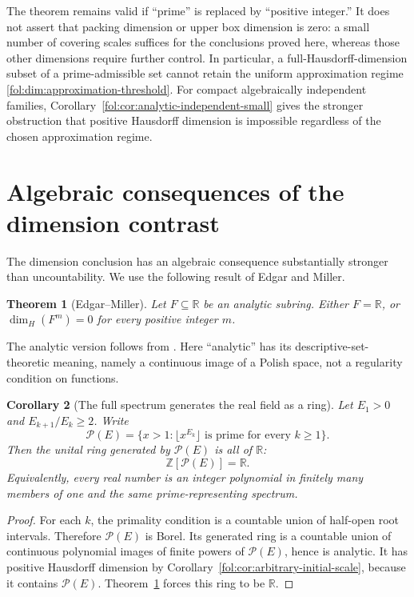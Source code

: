 \documentclass[11pt,a4paper]{article}
\newtheorem{theorem}{Theorem}[section]
\newtheorem{corollary}[theorem]{Corollary}
\theoremstyle{definition}
\theoremstyle{remark}
\numberwithin{equation}{section}
\begin{document}
The theorem remains valid if ``prime'' is replaced by ``positive
integer.''  It does not assert that packing dimension or upper box
dimension is zero: a small number of covering scales suffices for the
conclusions proved here, whereas those other dimensions require further
control.  In particular, a full-Hausdorff-dimension subset of a prime-admissible
set cannot retain the uniform approximation regime
\eqref{fol:dim:approximation-threshold}. For compact algebraically independent
families, Corollary~\ref{fol:cor:analytic-independent-small} gives the stronger
obstruction that positive Hausdorff dimension is impossible regardless
of the chosen approximation regime.


\section{Algebraic consequences of the dimension contrast}
\label{fol:sec:dimension-algebra}

The dimension conclusion has an algebraic consequence substantially stronger
than uncountability. We use the following result of Edgar and Miller.

\begin{theorem}[Edgar--Miller]\label{fol:thm:edgar-miller}
Let $F\subseteq\mathbb R$ be an analytic subring. Either $F=\mathbb R$, or
$\dim_H(F^m)=0$ for every positive integer $m$.
\end{theorem}

The analytic version follows from \cite[Theorem~1 and the subsequent
remarks]{EdgarMiller2003}. Here ``analytic'' has its descriptive-set-theoretic
meaning, namely a continuous image of a Polish space, not a regularity
condition on functions.

\begin{corollary}[The full spectrum generates the real field as a ring]
\label{fol:cor:prime-ring}
Let $E_1>0$ and $E_{k+1}/E_k\ge2$. Write
\[
 \mathcal P(E)=\{x>1:\lfloor x^{E_k}\rfloor
                 \text{ is prime for every }k\ge1\}.
\]
Then the unital ring generated by $\mathcal P(E)$ is all of $\mathbb R$:
\[
 \boxed{\mathbb Z[\mathcal P(E)]=\mathbb R.}
\]
Equivalently, every real number is an integer polynomial in finitely many
members of one and the same prime-representing spectrum.
\end{corollary}

\begin{proof}
For each $k$, the primality condition is a countable union of half-open
root intervals. Therefore $\mathcal P(E)$ is Borel. Its generated ring is
a countable union of continuous polynomial images of finite powers of
$\mathcal P(E)$, hence is analytic. It has positive Hausdorff dimension
by Corollary~\ref{fol:cor:arbitrary-initial-scale}, because it contains
$\mathcal P(E)$. Theorem~\ref{fol:thm:edgar-miller} forces this ring to be
$\mathbb R$.
\end{proof}
\end{document}

